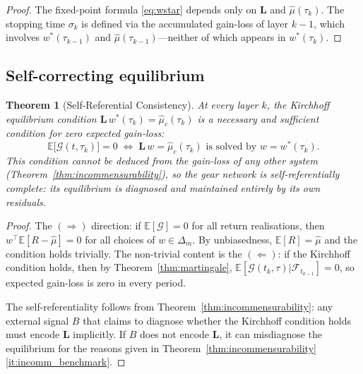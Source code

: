 \documentclass[twocolumn,11pt,a4paper]{article}
\theoremstyle{plain}
\newtheorem{theorem}{Theorem}[section]
\theoremstyle{definition}
\theoremstyle{remark}
\newcommand{\E}{\mathbb{E}}
\newcommand{\F}{\mathcal{F}}
\newcommand{\Lop}{\mathbf{L}}        %
\newcommand{\wstar}{w^{*}}
\newcommand{\Deltam}{\Delta_m}
\newcommand{\Gain}{\mathcal{G}}
\begin{document}
\begin{proof}
  The fixed-point formula \eqref{eq:wstar} depends only on $\Lop$ and
  $\hat\mu(\tau_k)$.  The stopping time $\sigma_k$ is defined via the
  accumulated gain-loss of layer $k-1$, which involves $\wstar(\tau_{k-1})$
  and $\hat\mu(\tau_{k-1})$---neither of which appears in $\wstar(\tau_k)$.
\end{proof}

\subsection{Self-correcting equilibrium}
\label{sec:self_correct}

\begin{theorem}[Self-Referential Consistency]
  \label{thm:self_referential}
  At every layer $k$, the Kirchhoff equilibrium condition
  $\Lop\,\wstar(\tau_k)=\hat\mu_c(\tau_k)$ is a necessary and
  sufficient condition for zero expected gain-loss:
  \begin{equation}
    \E\!\bigl[\Gain(t,\tau_k)\bigr]=0
    \;\iff\;
    \Lop\,w=\hat\mu_c(\tau_k)
    \text{ is solved by }w=\wstar(\tau_k).
    \label{eq:equilibrium_iff}
  \end{equation}
  This condition cannot be deduced from the gain-loss of any other
  system (Theorem~\ref{thm:incommensurability}), so the gear network
  is self-referentially complete: its equilibrium is diagnosed and
  maintained entirely by its own residuals.
\end{theorem}

\begin{proof}
  The $(\Rightarrow)$ direction: if $\E[\Gain]=0$ for all return
  realisations, then $w^{\top}\E[R-\hat\mu]=0$ for all choices of
  $w\in\Deltam$.  By unbiasedness, $\E[R]=\hat\mu$ and the condition
  holds trivially.  The non-trivial content is the $(\Leftarrow)$:
  if the Kirchhoff condition holds, then by
  Theorem~\ref{thm:martingale}, $\E[\Gain(t_k,\tau)|\F_{t_{k-1}}]=0$,
  so expected gain-loss is zero in every period.

  The self-referentiality follows from
  Theorem~\ref{thm:incommensurability}: any external signal $B$ that
  claims to diagnose whether the Kirchhoff condition holds must encode
  $\Lop$ implicitly.  If $B$ does not encode $\Lop$, it can misdiagnose
  the equilibrium for the reasons given in
  Theorem~\ref{thm:incommensurability}\ref{it:incomm_benchmark}.
\end{proof}
\end{document}
